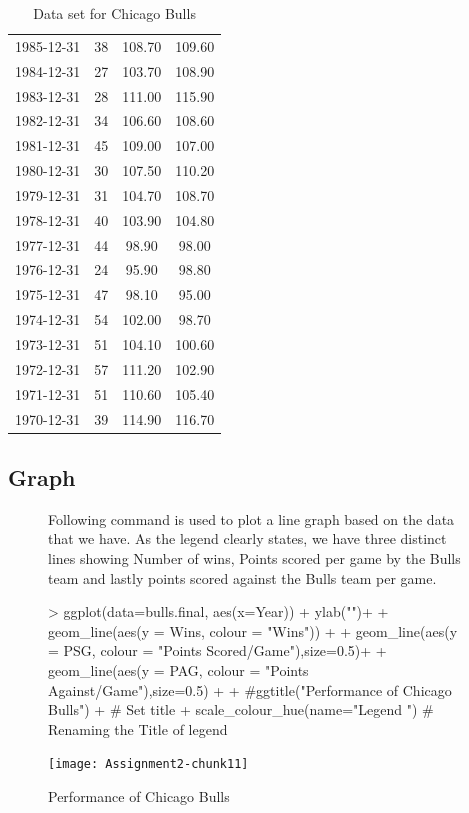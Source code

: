 \documentclass[a4paper]{article}
\begin{document}
\begin{table}[H]
\begin{tabular}{| c | c | c | c|}
  1985-12-31 & 38 & 108.70 & 109.60 \\ 
  1984-12-31 & 27 & 103.70 & 108.90 \\ 
  1983-12-31 & 28 & 111.00 & 115.90 \\ 
  1982-12-31 & 34 & 106.60 & 108.60 \\ 
  1981-12-31 & 45 & 109.00 & 107.00 \\ 
  1980-12-31 & 30 & 107.50 & 110.20 \\ 
  1979-12-31 & 31 & 104.70 & 108.70 \\ 
  1978-12-31 & 40 & 103.90 & 104.80 \\ 
  1977-12-31 & 44 & 98.90 & 98.00 \\ 
  1976-12-31 & 24 & 95.90 & 98.80 \\ 
  1975-12-31 & 47 & 98.10 & 95.00 \\ 
  1974-12-31 & 54 & 102.00 & 98.70 \\ 
  1973-12-31 & 51 & 104.10 & 100.60 \\ 
  1972-12-31 & 57 & 111.20 & 102.90 \\ 
  1971-12-31 & 51 & 110.60 & 105.40 \\ 
  1970-12-31 & 39 & 114.90 & 116.70 \\ 
   \hline
\end{tabular}\caption{Data set for Chicago Bulls}
\label{dataTable}
\end{table}





\subsection{Graph}
\begin{figure}[H]

Following command is used to plot a line graph based on the data that we have.
As the legend clearly states, we have three distinct lines showing Number of wins, Points scored per game by the Bulls team and lastly points scored against the Bulls team per game.

\begin{Schunk}
\begin{Sinput}
> ggplot(data=bulls.final, aes(x=Year)) + ylab("")+
+   geom_line(aes(y = Wins, colour = "Wins")) + 
+   geom_line(aes(y = PSG, colour = "Points Scored/Game"),size=0.5)+
+   geom_line(aes(y = PAG, colour = "Points Against/Game"),size=0.5) +
+   #ggtitle("Performance of Chicago Bulls") +   # Set title
+   scale_colour_hue(name="Legend ") # Renaming the Title of legend
\end{Sinput}
\end{Schunk}
\texttt{[image: Assignment2-chunk11]}
\caption{Performance of Chicago Bulls}
\label{PerChicagoBullsLogo}
\end{figure}
\end{document}
